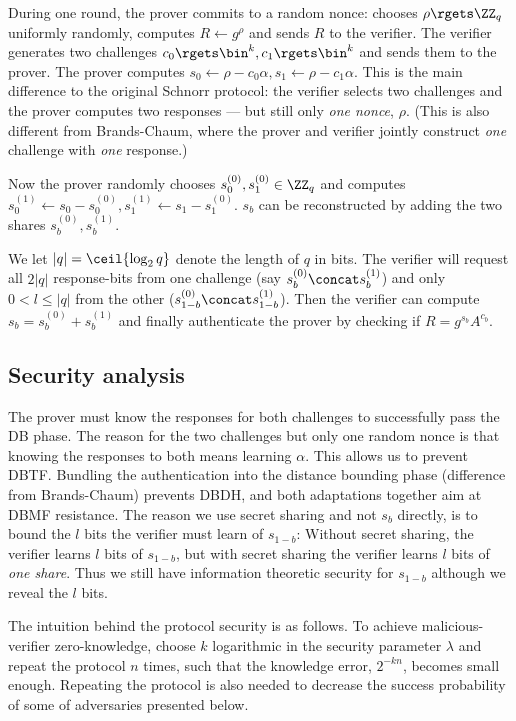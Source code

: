 During one round, the prover commits to a random nonce: \ie chooses 
\(\rho\rgets \ZZ_q\) uniformly randomly, computes \(R\gets g^\rho\) and sends 
\(R\) to the verifier.
The verifier generates two challenges \(c_0\rgets \bin^k, c_1\rgets \bin^k\) 
and sends them to the prover.
The prover computes \(s_0\gets \rho - c_0\alpha, s_1\gets \rho - c_1\alpha\).
This is the main difference to the original Schnorr protocol: the verifier 
selects two challenges and the prover computes two responses --- but still only 
\emph{one nonce}, \(\rho\).
(This is also different from Brands-Chaum, where the prover and verifier 
jointly construct \emph{one} challenge with \emph{one} response.)

Now the prover randomly chooses
\(s_0^{(0)}, s_1^{(0)}\in \ZZ_q\)
and computes
\(s_0^{(1)} \gets s_0 - s_0^{(0)}, s_1^{(1)} \gets s_1 - s_1^{(0)}\).
\Ie \(s_b\) can be reconstructed by adding the two shares \(s_b^{(0)}, 
  s_b^{(1)}\).

We let \(|q| = \ceil{\log_2 q}\) denote the length of \(q\) in bits.
The verifier will request all \(2|q|\) response-bits from one challenge (say 
\(s_b^{(0)}\concat s_b^{(1)}\)) and only \(0 < l\leq |q|\) from the other 
(\(s_{1-b}^{(0)}\concat s_{1-b}^{(1)}\)).
Then the verifier can compute \(s_b = s_b^{(0)} + s_b^{(1)}\) and finally 
authenticate the prover by checking if \(R = g^{s_b}A^{c_b}\).

\subsection{Security analysis}

The prover must know the responses for both challenges to successfully pass the 
\ac{DB} phase.
The reason for the two challenges but only one random nonce is that knowing the 
responses to both means learning \(\alpha\).
This allows us to prevent \ac{DBTF}.
Bundling the authentication into the distance bounding phase (difference from 
Brands-Chaum) prevents \ac{DBDH},
and both adaptations together aim at \ac{DBMF} resistance. %
The reason we use secret sharing and not \(s_b\) directly, is to bound the 
\(l\) bits the verifier must learn of \(s_{1-b}\):
Without secret sharing, the verifier learns \(l\) bits of \(s_{1-b}\), but with 
secret sharing the verifier learns \(l\) bits of \emph{one share}.
Thus we still have information theoretic security for \(s_{1-b}\) although we 
reveal the \(l\) bits.

The intuition behind the protocol security is as follows.
To achieve malicious-verifier zero-knowledge, choose \(k\) logarithmic in the 
security parameter \(\lambda\) and repeat the protocol \(n\) times, such that 
the knowledge error, \(2^{-kn}\), becomes small enough.
Repeating the protocol is also needed to decrease the success probability of 
some of adversaries presented below.


